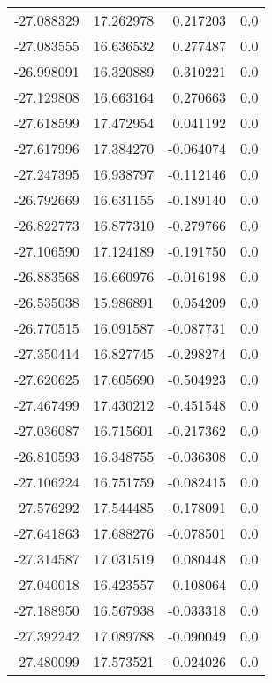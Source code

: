 \begin{tabular}{rrrr}
      -27.088329 &        17.262978 &    0.217203 &   0.0 \\
      -27.083555 &        16.636532 &    0.277487 &   0.0 \\
      -26.998091 &        16.320889 &    0.310221 &   0.0 \\
      -27.129808 &        16.663164 &    0.270663 &   0.0 \\
      -27.618599 &        17.472954 &    0.041192 &   0.0 \\
      -27.617996 &        17.384270 &   -0.064074 &   0.0 \\
      -27.247395 &        16.938797 &   -0.112146 &   0.0 \\
      -26.792669 &        16.631155 &   -0.189140 &   0.0 \\
      -26.822773 &        16.877310 &   -0.279766 &   0.0 \\
      -27.106590 &        17.124189 &   -0.191750 &   0.0 \\
      -26.883568 &        16.660976 &   -0.016198 &   0.0 \\
      -26.535038 &        15.986891 &    0.054209 &   0.0 \\
      -26.770515 &        16.091587 &   -0.087731 &   0.0 \\
      -27.350414 &        16.827745 &   -0.298274 &   0.0 \\
      -27.620625 &        17.605690 &   -0.504923 &   0.0 \\
      -27.467499 &        17.430212 &   -0.451548 &   0.0 \\
      -27.036087 &        16.715601 &   -0.217362 &   0.0 \\
      -26.810593 &        16.348755 &   -0.036308 &   0.0 \\
      -27.106224 &        16.751759 &   -0.082415 &   0.0 \\
      -27.576292 &        17.544485 &   -0.178091 &   0.0 \\
      -27.641863 &        17.688276 &   -0.078501 &   0.0 \\
      -27.314587 &        17.031519 &    0.080448 &   0.0 \\
      -27.040018 &        16.423557 &    0.108064 &   0.0 \\
      -27.188950 &        16.567938 &   -0.033318 &   0.0 \\
      -27.392242 &        17.089788 &   -0.090049 &   0.0 \\
      -27.480099 &        17.573521 &   -0.024026 &   0.0 \\

\end{tabular}
